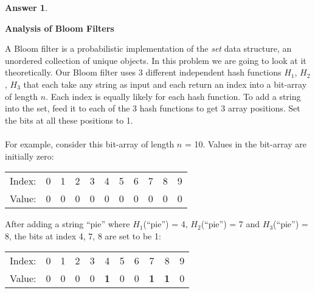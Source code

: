 \documentclass[12pt]{article}
\renewcommand{\(}{\left(}
\renewcommand{\)}{\right)}
\theoremstyle{definition}
\newtheorem*{answer}{Answer}
\begin{document}
\begin{enumerate}
{\begin{shaded}
\begin{answer}
    \end{answer}
    \end{shaded}
    \pagebreak
    \textbf{Analysis of Bloom Filters}
    \item A Bloom filter is a probabilistic implementation of the \textit{set} data structure, an unordered collection of unique objects. In this problem we are going to look at it theoretically. Our Bloom filter uses 3 different independent hash functions $H_1$, $H_2$, $H_3$ that each take any string as input and each return an index into a bit-array of length $n$. Each index is equally likely for each hash function. To add a string into the set, feed it to each of the 3 hash functions to get 3 array positions. Set the bits at all these positions to 1.\\ \\
    For example, consider this bit-array of length $n$ = 10. Values in the bit-array are initially zero:
    \begin{center}
        \begin{tabular}{r|c|c|c|c|c|c|c|c|c|c|}
        \multicolumn{1}{r}{Index:}
         & \multicolumn{1}{c}{0}
         & \multicolumn{1}{c}{1}
         & \multicolumn{1}{c}{2} 
         & \multicolumn{1}{c}{3}
         & \multicolumn{1}{c}{4}
         & \multicolumn{1}{c}{5} 
         & \multicolumn{1}{c}{6}
         & \multicolumn{1}{c}{7}
         & \multicolumn{1}{c}{8} 
         & \multicolumn{1}{c}{9} \\
        \cline{2-11}
        Value: & 0 & 0 & 0 & 0 & 0 & 0 & 0 & 0 & 0 & 0 \\
        \cline{2-11}
        \end{tabular}
    \end{center}
    After adding a string ``pie'' where $H_1$(``pie'') = 4, $H_2$(``pie'') = 7 and $H_3$(``pie'') = 8, the bits at index {4, 7, 8} are set to be 1: 
    \begin{center}
        \begin{tabular}{r|c|c|c|c|c|c|c|c|c|c|}
        \multicolumn{1}{r}{Index:}
         & \multicolumn{1}{c}{0}
         & \multicolumn{1}{c}{1}
         & \multicolumn{1}{c}{2} 
         & \multicolumn{1}{c}{3}
         & \multicolumn{1}{c}{4}
         & \multicolumn{1}{c}{5} 
         & \multicolumn{1}{c}{6}
         & \multicolumn{1}{c}{7}
         & \multicolumn{1}{c}{8} 
         & \multicolumn{1}{c}{9} \\
        \cline{2-11}
        Value: & 0 & 0 & 0 & 0 & \textbf{1} & 0 & 0 & \textbf{1} & \textbf{1} & 0 \\
        \cline{2-11}
        \end{tabular}
    \end{center}
    
}
\end{enumerate}
\end{document}
